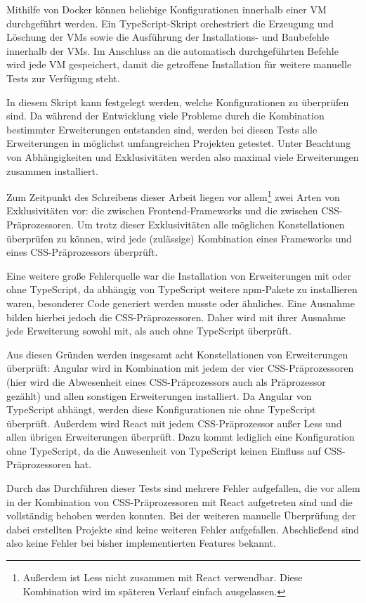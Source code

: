 Mithilfe von Docker können beliebige Konfigurationen innerhalb einer \gls{VM} durchgeführt werden. Ein TypeScript-Skript orchestriert die Erzeugung und Löschung der \gls{VM}s sowie die Ausführung der Installations- und Baubefehle innerhalb der \gls{VM}s. Im Anschluss an die automatisch durchgeführten Befehle wird jede \gls{VM} gespeichert, damit die getroffene Installation für weitere manuelle Tests zur Verfügung steht.

In diesem Skript kann festgelegt werden, welche Konfigurationen zu überprüfen sind. Da während der Entwicklung viele Probleme durch die Kombination bestimmter Erweiterungen entstanden sind, werden bei diesen Tests alle Erweiterungen in möglichst umfangreichen Projekten getestet. Unter Beachtung von Abhängigkeiten und Exklusivitäten werden also maximal viele Erweiterungen zusammen installiert.

Zum Zeitpunkt des Schreibens dieser Arbeit liegen vor allem\footnote{Außerdem ist Less nicht zusammen mit React verwendbar. Diese Kombination wird im späteren Verlauf einfach ausgelassen.} zwei Arten von Exklusivitäten vor: die zwischen Frontend-Frameworks und die zwischen CSS-Präprozessoren. Um trotz dieser Exklusivitäten alle möglichen Konstellationen überprüfen zu können, wird jede (zulässige) Kombination eines Frameworks und eines CSS-Präprozessors überprüft.

Eine weitere große Fehlerquelle war die Installation von Erweiterungen mit oder ohne TypeScript, da abhängig von TypeScript weitere \gls{npm}-Pakete zu installieren waren, besonderer Code generiert werden musste oder ähnliches. Eine Ausnahme bilden hierbei jedoch die CSS-Präprozessoren. Daher wird mit ihrer Ausnahme jede Erweiterung sowohl mit, als auch ohne TypeScript überprüft.

Aus diesen Gründen werden insgesamt acht Konstellationen von Erweiterungen überprüft: Angular wird in Kombination mit jedem der vier CSS-Präprozessoren (hier wird die Abwesenheit eines CSS-Präprozessors auch als Präprozessor gezählt) und allen sonstigen Erweiterungen installiert. Da Angular von TypeScript abhängt, werden diese Konfigurationen nie ohne TypeScript überprüft. Außerdem wird React mit jedem CSS-Präprozessor außer Less und allen übrigen Erweiterungen überprüft. Dazu kommt lediglich eine Konfiguration ohne TypeScript, da die Anwesenheit von TypeScript keinen Einfluss auf CSS-Präprozessoren hat.

Durch das Durchführen dieser Tests sind mehrere Fehler aufgefallen, die vor allem in der Kombination von CSS-Präprozessoren mit React aufgetreten sind und die vollständig behoben werden konnten. Bei der weiteren manuelle Überprüfung der dabei erstellten Projekte sind keine weiteren Fehler aufgefallen. Abschließend sind also keine Fehler bei bisher implementierten Features bekannt.

